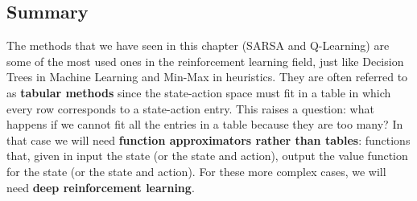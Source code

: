 \subsection{Summary}
The methods that we have seen in this chapter (SARSA and Q-Learning) are some of the most used ones in the reinforcement learning field, just like Decision Trees in Machine Learning and Min-Max in heuristics. They are often referred to as \textbf{tabular methods} since the state-action space must fit in a table in which every row corresponds to a state-action entry. This raises a question: what happens if we cannot fit all the entries in a table because they are too many? In that case we will need \textbf{function approximators rather than tables}: functions that, given in input the state (or the state and action), output the value function for the state (or the state and action). For these more complex cases, we will need \textbf{deep reinforcement learning}.